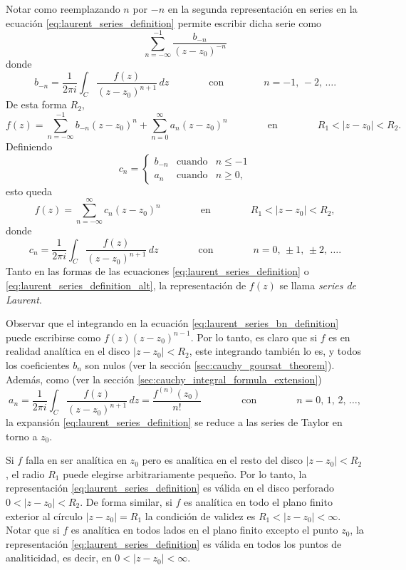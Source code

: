 \documentclass[a4paper]{report}
\begin{document}
Notar como reemplazando \(n\) por \(-n\) en la segunda representación en series en la ecuación \ref{eq:laurent_series_definition} permite escribir dicha serie como
\[
 \sum_{n=-\infty}^{-1}\frac{b_{-n}}{(z-z_0)^{-n}}
\]
donde
\[
 b_{-n}=\frac{1}{2\pi i}\int_C\frac{f(z)}{(z-z_0)^{n+1}}\,dz
 \qquad\qquad\textrm{con}\qquad\qquad
 n=-1,\,-2,\,\dots.
\]
De esta forma \(R_2\),
\[
 f(z)=\sum_{n=-\infty}^{-1}b_{-n}(z-z_0)^n+\sum_{n=0}^\infty a_n(z-z_0)^n
 \qquad\qquad\textrm{en}\qquad\qquad
 R_1<|z-z_0|<R_2.
\]
Definiendo
\[
 c_n=
 \left\{
 \begin{array}{lll}
  b_{-n} &\textrm{cuando} &n\leq-1\\
  a_n &\textrm{cuando}&n\geq0,
 \end{array}
 \right.
\]
esto queda
\begin{equation}\label{eq:laurent_series_definition_alt}
 f(z)=\sum_{n=-\infty}^\infty c_n(z-z_0)^n
 \qquad\qquad\textrm{en}\qquad\qquad
 R_1<|z-z_0|<R_2, 
\end{equation}
donde
\begin{equation}\label{eq:laurent_series_definition_alt_cn}
 c_n=\frac{1}{2\pi i}\int_C\frac{f(z)}{(z-z_0)^{n+1}}\,dz
 \qquad\qquad\textrm{con}\qquad\qquad
 n=0,\,\pm1,\,\pm2,\,\dots. 
\end{equation}
Tanto en las formas de las ecuaciones \ref{eq:laurent_series_definition} o \ref{eq:laurent_series_definition_alt}, la representación de \(f(z)\) se llama \emph{series de Laurent}.

Observar que el integrando en la ecuación \ref{eq:laurent_series_bn_definition} puede escribirse como \(f(z)(z-z_0)^{n-1}\). Por lo tanto, es claro que si \(f\) es en realidad analítica en el disco \(|z-z_0|<R_2\), este  integrando también lo es, y todos los coeficientes \(b_n\) son nulos (ver la sección \ref{sec:cauchy_goursat_theorem}). Además, como (ver la sección \ref{sec:cauchy_integral_formula_extension})
\[
 a_n=\frac{1}{2\pi i}\int_C\frac{f(z)}{(z-z_0)^{n+1}}\,dz=\frac{f^{(n)}(z_0)}{n!}
 \qquad\qquad\textrm{con}\qquad\qquad
 n=0,\,1,\,2,\,\dots,
\]
la expansión \ref{eq:laurent_series_definition} se reduce a las series de Taylor en torno a \(z_0\).

Si \(f\) falla en ser analítica en \(z_0\) pero es analítica en el resto del disco \(|z-z_0|<R_2\), el radio \(R_1\) puede elegirse arbitrariamente pequeño. Por lo tanto, la representación \ref{eq:laurent_series_definition} es válida en el disco perforado \(0<|z-z_0|<R_2\). De forma similar, si \(f\) es analítica en todo el plano finito exterior al círculo \(|z-z_0|=R_1\) la condición de validez es \(R_1<|z-z_0|<\infty\). Notar que si \(f\) es analítica en todos lados en el plano finito excepto el punto \(z_0\), la representación \ref{eq:laurent_series_definition} es válida en todos los puntos de analiticidad, es decir, en \(0<|z-z_0|<\infty\).
\end{document}
